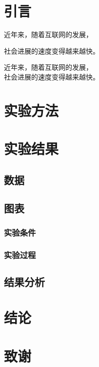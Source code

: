 \documentclass{article}
\begin{document}
    \section{引言}
    近年来，随着互联网的发展，\par 社会进展的速度变得越来越快。

    近年来，随着互联网的发展，\\社会进展的速度变得越来越快。
    \section{实验方法}
    \section{实验结果}
    \subsection{数据}
    \subsection{图表}
    \subsubsection{实验条件}
    \subsubsection{实验过程}
    \subsection{结果分析}
    \section{结论}
    \section{致谢}
\end{document}

